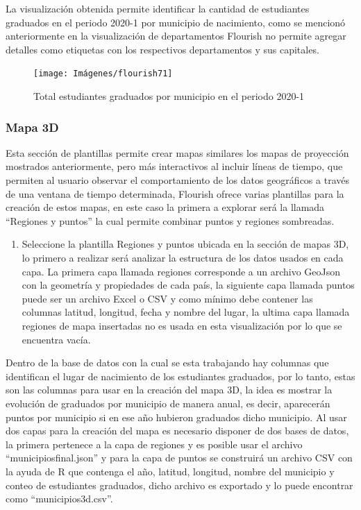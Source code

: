 \documentclass[
]{book}
\providecommand{\tightlist}{%
  \setlength{\itemsep}{0pt}\setlength{\parskip}{0pt}}
\begin{document}
La visualización obtenida permite identificar la cantidad de estudiantes graduados en el periodo 2020-1 por municipio de nacimiento, como se mencionó anteriormente en la visualización de departamentos Flourish no permite agregar detalles como etiquetas con los respectivos departamentos y sus capitales.

\begin{figure}

{\centering \texttt{[image: Imágenes/flourish71]} 

}

\caption{Total estudiantes graduados por municipio en el periodo 2020-1}\label{fig:mapampiosflourish-fig}
\end{figure}

\hypertarget{mapa3Dflourish}{%
\subsubsection{Mapa 3D}\label{mapa3Dflourish}}

Esta sección de plantillas permite crear mapas similares los mapas de proyección mostrados anteriormente, pero más interactivos al incluir líneas de tiempo, que permiten al usuario observar el comportamiento de los datos geográficos a través de una ventana de tiempo determinada, Flourish ofrece varias plantillas para la creación de estos mapas, en este caso la primera a explorar será la llamada ``Regiones y puntos'' la cual permite combinar puntos y regiones sombreadas.

\begin{enumerate}
\def\labelenumi{\arabic{enumi}.}
\tightlist
\item
  Seleccione la plantilla Regiones y puntos ubicada en la sección de mapas 3D, lo primero a realizar será analizar la estructura de los datos usados en cada capa. La primera capa llamada regiones corresponde a un archivo GeoJson con la geometría y propiedades de cada país, la siguiente capa llamada puntos puede ser un archivo Excel o CSV y como mínimo debe contener las columnas latitud, longitud, fecha y nombre del lugar, la ultima capa llamada regiones de mapa insertadas no es usada en esta visualización por lo que se encuentra vacía.
\end{enumerate}

Dentro de la base de datos con la cual se esta trabajando hay columnas que identifican el lugar de nacimiento de los estudiantes graduados, por lo tanto, estas son las columnas para usar en la creación del mapa 3D, la idea es mostrar la evolución de graduados por municipio de manera anual, es decir, aparecerán puntos por municipio si en ese año hubieron graduados dicho municipio. Al usar dos capas para la creación del mapa es necesario disponer de dos bases de datos, la primera pertenece a la capa de regiones y es posible usar el archivo ``municipiosfinal.json'' y para la capa de puntos se construirá un archivo CSV con la ayuda de R que contenga el año, latitud, longitud, nombre del municipio y conteo de estudiantes graduados, dicho archivo es exportado y lo puede encontrar como ``municipios3d.csv''.
\end{document}
